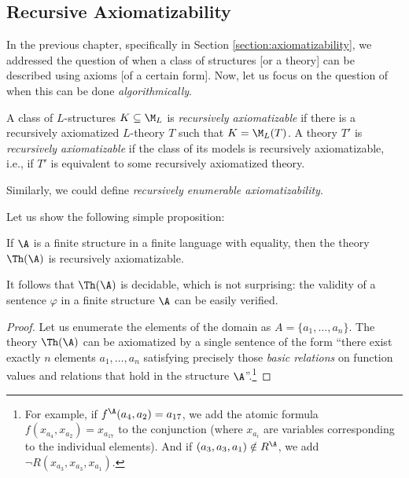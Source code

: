  
\subsection{Recursive Axiomatizability}

In the previous chapter, specifically in Section \ref{section:axiomatizability}, we addressed the question of when a class of structures [or a theory] can be described using axioms [of a certain form]. Now, let us focus on the question of when this can be done \emph{algorithmically}.

\begin{definition}
A class of $L$-structures $K \subseteq \M_L$ is \emph{recursively axiomatizable} if there is a recursively axiomatized $L$-theory $T$ such that $K = \M_L(T)$. A theory $T'$ is \emph{recursively axiomatizable} if the class of its models is recursively axiomatizable, i.e., if $T'$ is equivalent to some recursively axiomatized theory.
\end{definition}
\begin{remark}
    Similarly, we could define \emph{recursively enumerable axiomatizability}.
\end{remark}

Let us show the following simple proposition:

\begin{proposition}
    If $\A$ is a finite structure in a finite language with equality, then the theory $\Th(\A)$ is recursively axiomatizable.
\end{proposition}
\begin{remark}
    It follows that $\Th(\A)$ is decidable, which is not surprising: the validity of a sentence $\varphi$ in a finite structure $\A$ can be easily verified.
\end{remark}
\begin{proof}
    Let us enumerate the elements of the domain as $A = \{a_1, \dots, a_n\}$. The theory $\Th(\A)$ can be axiomatized by a single sentence of the form ``there exist exactly $n$ elements $a_1, \dots, a_n$ satisfying precisely those \emph{basic relations} on function values and relations that hold in the structure $\A$''.\footnote{For example, if $f^\A(a_4, a_2) = a_{17}$, we add the atomic formula $f(x_{a_4}, x_{a_2}) = x_{a_{17}}$ to the conjunction (where $x_{a_i}$ are variables corresponding to the individual elements). And if $(a_3, a_3, a_1) \notin R^\A$, we add $\neg R(x_{a_3}, x_{a_3}, x_{a_1})$.}    
\end{proof}
 
